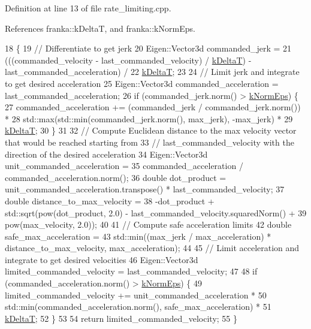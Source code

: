 Definition at line 13 of file rate\+\_\+limiting.\+cpp.



References franka\+::k\+DeltaT, and franka\+::k\+Norm\+Eps.


\begin{DoxyCode}
18                                                                             \{
19   \textcolor{comment}{// Differentiate to get jerk}
20   Eigen::Vector3d commanded\_jerk =
21       (((commanded\_velocity - last\_commanded\_velocity) / \hyperlink{namespacefranka_a1e207a0d5a6e90c1e1a78e6e1057120a}{kDeltaT}) - last\_commanded\_acceleration) /
22       \hyperlink{namespacefranka_a1e207a0d5a6e90c1e1a78e6e1057120a}{kDeltaT};
23 
24   \textcolor{comment}{// Limit jerk and integrate to get desired acceleration}
25   Eigen::Vector3d commanded\_acceleration = last\_commanded\_acceleration;
26   \textcolor{keywordflow}{if} (commanded\_jerk.norm() > \hyperlink{namespacefranka_a420d72830a872ef375d9d6cbb1c439b5}{kNormEps}) \{
27     commanded\_acceleration += (commanded\_jerk / commanded\_jerk.norm()) *
28                               std::max(std::min(commanded\_jerk.norm(), max\_jerk), -max\_jerk) *
29                               \hyperlink{namespacefranka_a1e207a0d5a6e90c1e1a78e6e1057120a}{kDeltaT};
30   \}
31 
32   \textcolor{comment}{// Compute Euclidean distance to the max velocity vector that would be reached starting from}
33   \textcolor{comment}{// last\_commanded\_velocity with the direction of the desired acceleration}
34   Eigen::Vector3d unit\_commanded\_acceleration =
35       commanded\_acceleration / commanded\_acceleration.norm();
36   \textcolor{keywordtype}{double} dot\_product = unit\_commanded\_acceleration.transpose() * last\_commanded\_velocity;
37   \textcolor{keywordtype}{double} distance\_to\_max\_velocity =
38       -dot\_product + std::sqrt(pow(dot\_product, 2.0) - last\_commanded\_velocity.squaredNorm() +
39                                pow(max\_velocity, 2.0));
40 
41   \textcolor{comment}{// Compute safe acceleration limits}
42   \textcolor{keywordtype}{double} safe\_max\_acceleration =
43       std::min((max\_jerk / max\_acceleration) * distance\_to\_max\_velocity, max\_acceleration);
44 
45   \textcolor{comment}{// Limit acceleration and integrate to get desired velocities}
46   Eigen::Vector3d limited\_commanded\_velocity = last\_commanded\_velocity;
47 
48   \textcolor{keywordflow}{if} (commanded\_acceleration.norm() > \hyperlink{namespacefranka_a420d72830a872ef375d9d6cbb1c439b5}{kNormEps}) \{
49     limited\_commanded\_velocity += unit\_commanded\_acceleration *
50                                   std::min(commanded\_acceleration.norm(), safe\_max\_acceleration) *
51                                   \hyperlink{namespacefranka_a1e207a0d5a6e90c1e1a78e6e1057120a}{kDeltaT};
52   \}
53 
54   \textcolor{keywordflow}{return} limited\_commanded\_velocity;
55 \}
\end{DoxyCode}
